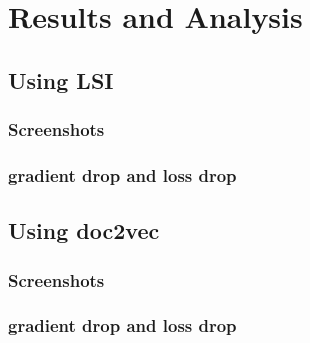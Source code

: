 \chapter{Results and Analysis}
\section{Using LSI}
\subsection{Screenshots}
\subsection{gradient drop and loss drop}

\section{Using doc2vec}
\subsection{Screenshots}
\subsection{gradient drop and loss drop}


